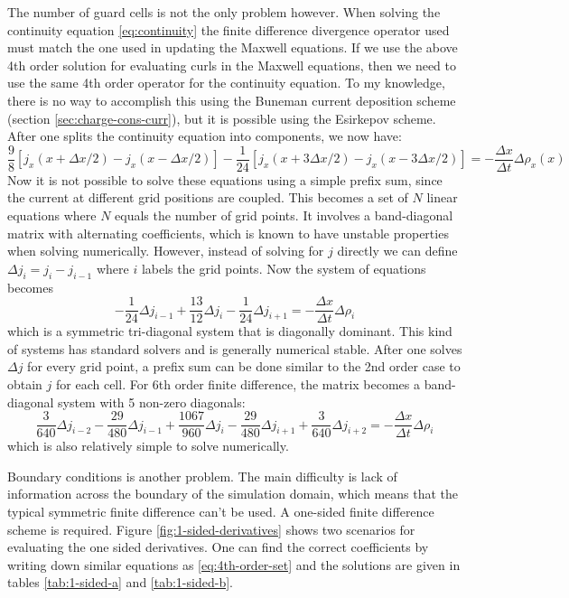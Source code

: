 The number of guard cells is not the only problem however. When solving the
continuity equation \eqref{eq:continuity} the finite difference divergence
operator used must match the one used in updating the Maxwell equations. If we
use the above 4th order solution for evaluating curls in the Maxwell equations,
then we need to use the same 4th order operator for the continuity equation. To
my knowledge, there is no way to accomplish this using the Buneman current
deposition scheme (section \ref{sec:charge-cons-curr}), but it is possible using
the Esirkepov scheme. After one splits the continuity equation into components,
we now have:
\begin{equation}
  \label{eq:4th-order-esirkepov}
  \frac{9}{8}\left[ j_x(x+\Delta x/2) - j_x(x-\Delta x/2)\right] - \frac{1}{24}\left[ j_x(x + 3\Delta x/2) - j_x(x - 3\Delta x/2) \right] = -\frac{\Delta x}{\Delta t}\Delta \rho_x(x)
\end{equation}
Now it is not possible to solve these equations using a simple prefix sum, since
the current at different grid positions are coupled. This becomes a set of $N$
linear equations where $N$ equals the number of grid points. It involves a
band-diagonal matrix with alternating coefficients, which is known to have
unstable properties when solving numerically. However, instead of solving for
$j$ directly we can define $\Delta j_i = j_i - j_{i-1}$ where $i$ labels the
grid points. Now the system of equations becomes
\begin{equation}
  \label{eq:4th-order-system}
  - \frac{1}{24}\Delta j_{i-1} + \frac{13}{12}\Delta j_i - \frac{1}{24}\Delta j_{i+1} = -\frac{\Delta x}{\Delta t}\Delta \rho_{i}
\end{equation}
which is a symmetric tri-diagonal system that is diagonally dominant. This kind
of systems has standard solvers and is generally numerical stable. After one
solves $\Delta j$ for every grid point, a prefix sum can be done similar to the
2nd order case to obtain $j$ for each cell. For 6th order finite difference, the
matrix becomes a band-diagonal system with 5 non-zero diagonals:
\begin{equation}
  \label{eq:6th-order-system}
  \frac{3}{640}\Delta j_{i-2} - \frac{29}{480}\Delta j_{i-1} + \frac{1067}{960}\Delta j_i - \frac{29}{480}\Delta j_{i+1} + \frac{3}{640}\Delta j_{i+2} = -\frac{\Delta x}{\Delta t}\Delta \rho_{i}
\end{equation}
which is also relatively simple to solve numerically.

Boundary conditions is another problem. The main difficulty is lack of
information across the boundary of the simulation domain, which means that the
typical symmetric finite difference can't be used. A one-sided finite difference
scheme is required. Figure \ref{fig:1-sided-derivatives} shows two scenarios for
evaluating the one sided derivatives. One can find the correct coefficients by
writing down similar equations as \eqref{eq:4th-order-set} and the solutions are
given in tables \ref{tab:1-sided-a} and
\ref{tab:1-sided-b}. %

